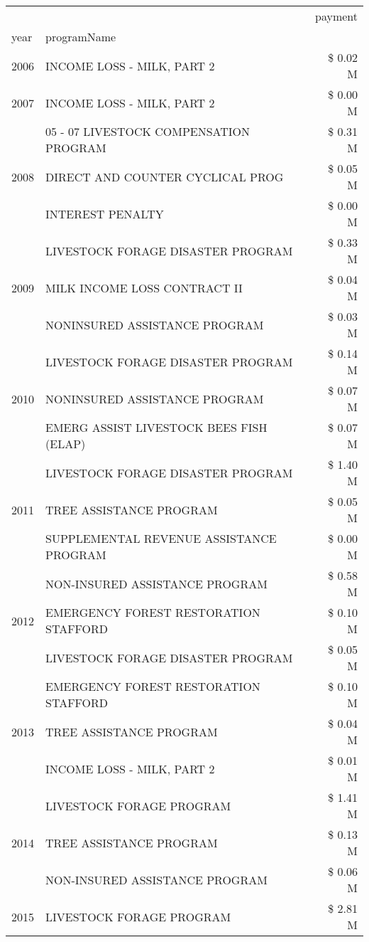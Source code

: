 \begin{tabular}{llr}
\toprule
 &  & payment \\
year & programName &  \\
\midrule
2006 & INCOME LOSS - MILK, PART 2 & \$ 0.02 M \\
\cline{1-3}
2007 & INCOME LOSS - MILK, PART 2 & \$ 0.00 M \\
\cline{1-3}
\multirow[t]{3}{*}{2008} & 05 - 07 LIVESTOCK COMPENSATION PROGRAM & \$ 0.31 M \\
 & DIRECT AND COUNTER CYCLICAL PROG & \$ 0.05 M \\
 & INTEREST PENALTY & \$ 0.00 M \\
\cline{1-3}
\multirow[t]{3}{*}{2009} & LIVESTOCK FORAGE DISASTER  PROGRAM & \$ 0.33 M \\
 & MILK INCOME LOSS CONTRACT II & \$ 0.04 M \\
 & NONINSURED ASSISTANCE PROGRAM & \$ 0.03 M \\
\cline{1-3}
\multirow[t]{3}{*}{2010} & LIVESTOCK FORAGE DISASTER PROGRAM & \$ 0.14 M \\
 & NONINSURED ASSISTANCE PROGRAM & \$ 0.07 M \\
 & EMERG ASSIST LIVESTOCK BEES FISH (ELAP) & \$ 0.07 M \\
\cline{1-3}
\multirow[t]{3}{*}{2011} & LIVESTOCK FORAGE DISASTER PROGRAM & \$ 1.40 M \\
 & TREE ASSISTANCE PROGRAM & \$ 0.05 M \\
 & SUPPLEMENTAL REVENUE ASSISTANCE PROGRAM & \$ 0.00 M \\
\cline{1-3}
\multirow[t]{3}{*}{2012} & NON-INSURED ASSISTANCE PROGRAM & \$ 0.58 M \\
 & EMERGENCY FOREST RESTORATION STAFFORD & \$ 0.10 M \\
 & LIVESTOCK FORAGE DISASTER PROGRAM & \$ 0.05 M \\
\cline{1-3}
\multirow[t]{3}{*}{2013} & EMERGENCY FOREST RESTORATION STAFFORD & \$ 0.10 M \\
 & TREE ASSISTANCE PROGRAM & \$ 0.04 M \\
 & INCOME LOSS - MILK, PART 2 & \$ 0.01 M \\
\cline{1-3}
\multirow[t]{3}{*}{2014} & LIVESTOCK FORAGE PROGRAM & \$ 1.41 M \\
 & TREE ASSISTANCE PROGRAM & \$ 0.13 M \\
 & NON-INSURED ASSISTANCE PROGRAM & \$ 0.06 M \\
\cline{1-3}
\multirow[t]{3}{*}{2015} & LIVESTOCK FORAGE PROGRAM & \$ 2.81 M \\

\end{tabular}
